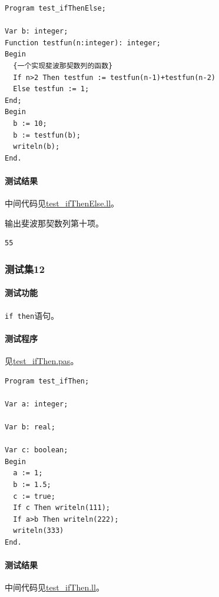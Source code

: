 \documentclass[lang=cn,11pt,a4paper,cite=authornum]{paper}
\begin{document}
\begin{code}
\begin{verbatim}
Program test_ifThenElse;

Var b: integer;
Function testfun(n:integer): integer;
Begin
  {一个实现斐波那契数列的函数}
  If n>2 Then testfun := testfun(n-1)+testfun(n-2)
  Else testfun := 1;
End;
Begin
  b := 10;
  b := testfun(b);
  writeln(b);
End.
\end{verbatim}
\end{code}

\paragraph{测试结果} 中间代码见\href{run:../test/test_ifThenElse.ll}{test\_ifThenElse.ll}。

输出斐波那契数列第十项。

\begin{code}
\begin{verbatim}
55
\end{verbatim}
\end{code}

\subsubsection{测试集12}

\paragraph{测试功能} \texttt{if then}语句。

\paragraph{测试程序} 见\href{run:../test/test_ifThen.pas}{test\_ifThen.pas}。

\begin{code}
\begin{verbatim}
Program test_ifThen;

Var a: integer;

Var b: real;

Var c: boolean;
Begin
  a := 1;
  b := 1.5;
  c := true;
  If c Then writeln(111);
  If a>b Then writeln(222);
  writeln(333)
End.
\end{verbatim}
\end{code}

\paragraph{测试结果} 中间代码见\href{run:../test/test_ifThen.ll}{test\_ifThen.ll}。
\end{document}
